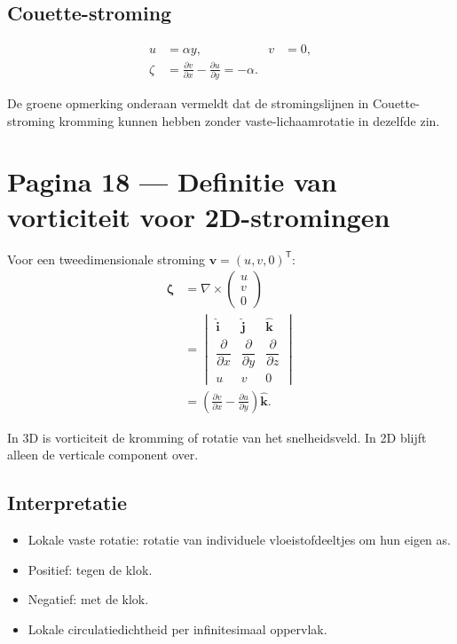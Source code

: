 \documentclass[11pt]{article}
\newcommand{\vect}[1]{\mathbf{#1}}
\begin{document}
\subsection*{Couette-stroming}

\begin{align*}
u
  &=
  \alpha y,
&
v
  &=
  0,
\\
\zeta
  &=
  \frac{\partial v}{\partial x}
  -
  \frac{\partial u}{\partial y}
   =
  -\alpha.
\end{align*}

De groene opmerking onderaan vermeldt dat de stromingslijnen in Couette-stroming kromming kunnen hebben zonder vaste-lichaamrotatie in dezelfde zin.

\section*{Pagina 18 --- Definitie van vorticiteit voor 2D-stromingen}

Voor een tweedimensionale stroming $\vect{v}=\left(u,v,0\right)^{\mathsf{T}}$:
\begin{align*}
\bm{\zeta}
  &=
  \nabla\times
  \begin{pmatrix}
  u\\
  v\\
  0
  \end{pmatrix}
\\
  &=
  \begin{vmatrix}
  \hat{\vect{i}} & \hat{\vect{j}} & \hat{\vect{k}}\\
  \dfrac{\partial}{\partial x}
    & \dfrac{\partial}{\partial y}
    & \dfrac{\partial}{\partial z}\\
  u & v & 0
  \end{vmatrix}
\\
  &=
  \left(
  \frac{\partial v}{\partial x}
  -
  \frac{\partial u}{\partial y}
  \right)\hat{\vect{k}}.
\end{align*}

In 3D is vorticiteit de kromming of rotatie van het snelheidsveld. In 2D blijft alleen de verticale component over.

\subsection*{Interpretatie}

\begin{itemize}
\item Lokale vaste rotatie: rotatie van individuele vloeistofdeeltjes om hun eigen as.
\item Positief: tegen de klok.
\item Negatief: met de klok.
\item Lokale circulatiedichtheid per infinitesimaal oppervlak.
\end{itemize}
\end{document}
